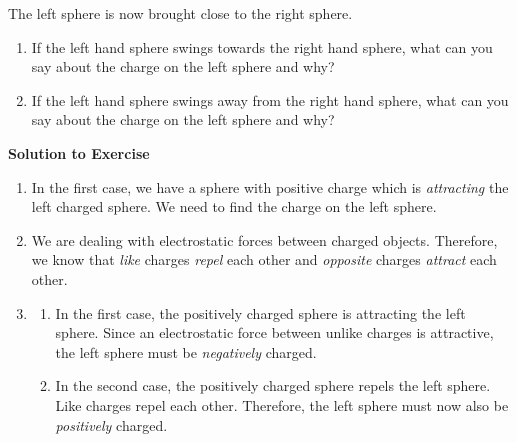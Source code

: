{\begin{mdframed}[linewidth=4, leftmargin=40, rightmargin=40]
\begin{exercise}
      \par 
      \label{m38780*id201031}The left sphere is now brought close to the right sphere.\par 
      \label{m38780*id201034}\begin{enumerate}[noitemsep, label=\textbf{\arabic*}. ] 
            \leftskip=20pt\rightskip=\leftskip\label{m38780*uid3}\item If the left hand sphere swings towards the right hand sphere, what can you say about the charge on the left sphere and why?
\label{m38780*uid4}\item If the left hand sphere swings away from the right hand sphere, what can you say about the charge on the left sphere and why?
\end{enumerate}
        
      
      \vspace{5pt}
      \label{m38780*solfhsst!!!underscore!!!id210}\noindent\textbf{Solution to Exercise } \label{m38780*listfhsst!!!underscore!!!id210}\begin{enumerate}[noitemsep, label=\textbf{Step} \textbf{\arabic*}. ] 
            \leftskip=20pt\rightskip=\leftskip\item  
      \label{m38780*id201084}In the first case, we have a sphere with positive charge which is \textsl{attracting} the left charged sphere. We need to find the charge on the left sphere.\par 
      \item  
      \label{m38780*id201097}We are dealing with electrostatic forces between charged objects. Therefore, we know that \textsl{like} charges \textsl{repel} each other and \textsl{opposite} charges \textsl{attract} each other.\par 
      \item  
      \label{m38780*id201126}\begin{enumerate}[noitemsep, label=\textbf{\alph*}. ] 
            \leftskip=20pt\rightskip=\leftskip\label{m38780*uid5}\item In the first case, the positively charged sphere is attracting the left sphere. Since an electrostatic force between unlike charges is attractive, the left sphere must be \textsl{negatively} charged.
\label{m38780*uid6}\item In the second case, the positively charged sphere repels the left sphere. Like charges repel each other. Therefore, the left sphere must now also be \textsl{positively} charged.
\end{enumerate}
        
      
      \end{enumerate}
         

    \end{exercise}
    \end{mdframed}
    }
    \noindent
  

